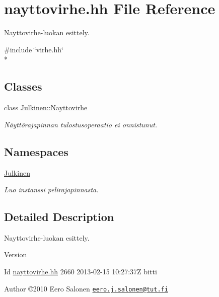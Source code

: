 \hypertarget{nayttovirhe_8hh}{}\section{nayttovirhe.\+hh File Reference}
\label{nayttovirhe_8hh}


Nayttovirhe-\/luokan esittely.  


{\ttfamily \#include \char`\"{}virhe.\+hh\char`\"{}}\\*
\subsection*{Classes}
\begin{DoxyCompactItemize}
\item 
class \hyperlink{class_julkinen_1_1_nayttovirhe}{Julkinen\+::\+Nayttovirhe}
\begin{DoxyCompactList}\small\item\em Näyttörajapinnan tulostusoperaatio ei onnistunut. \end{DoxyCompactList}\end{DoxyCompactItemize}
\subsection*{Namespaces}
\begin{DoxyCompactItemize}
\item 
 \hyperlink{namespace_julkinen}{Julkinen}
\begin{DoxyCompactList}\small\item\em Luo instanssi pelirajapinnasta. \end{DoxyCompactList}\end{DoxyCompactItemize}


\subsection{Detailed Description}
Nayttovirhe-\/luokan esittely. 

\begin{DoxyVersion}{Version}

\end{DoxyVersion}
\begin{DoxyParagraph}{Id}
\hyperlink{nayttovirhe_8hh}{nayttovirhe.\+hh} 2660 2013-\/02-\/15 10\+:27\+:37\+Z bitti 
\end{DoxyParagraph}


\begin{DoxyAuthor}{Author}
©2010 Eero Salonen \href{mailto:eero.j.salonen@tut.fi}{\tt eero.\+j.\+salonen@tut.\+fi} 
\end{DoxyAuthor}
